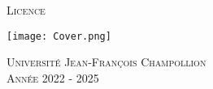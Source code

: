 \begin{titlepage}
   \begin{center}
       \vspace*{1cm}
       {
           \hfill
           \setlength{\fboxsep}{0.8em}\setlength{\fboxrule}{4pt}
           \color{DarkBlue1}\HUGE{}\hfill}

       \<
       {
       \color{DarkBlue1}\Large
       \textsc{Licence}
       }
       \<

       \vspace{1.5cm}

       \texttt{[image: Cover.png]}

       \vfill

       \large
       \textsc{Université Jean-François Champollion}\\
       \textsc{Année 2022 - 2025}
   \end{center}
\end{titlepage}